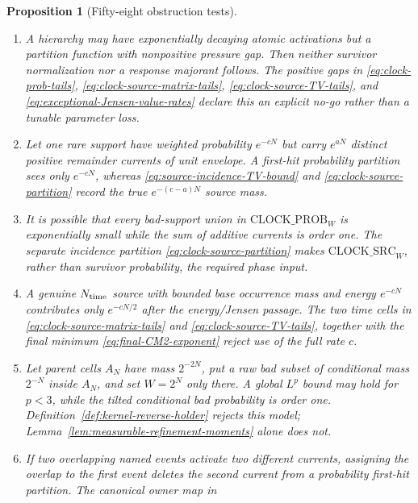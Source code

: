 \documentclass[11pt]{article}
\newtheorem{proposition}[theorem]{Proposition}
\begin{document}
\begin{proposition}[Fifty-eight obstruction tests]
\begin{enumerate}[label=\textup{(T\arabic*)}]
      \eqref{eq:upper-scale-excess-tail} prevents the upper-scale ledger from
      evaluating a nonexistent random variable; cemetery mass is charged by
      $\mathrm{CEM\_DOM}$ and $\mathrm{CLOCK\_PROB}_{W}$.
\item A hierarchy may have exponentially decaying atomic activations but a
      partition function with nonpositive pressure gap.  Then neither
      survivor normalization nor a response majorant follows.  The positive
      gaps in \eqref{eq:clock-prob-tails},
      \eqref{eq:clock-source-matrix-tails},
      \eqref{eq:clock-source-TV-tails}, and
      \eqref{eq:exceptional-Jensen-value-rates} declare this an explicit
      no-go rather than a tunable parameter loss.
\item Let one rare support have weighted probability $e^{-cN}$ but carry
      $e^{aN}$ distinct positive remainder currents of unit envelope.  A
      first-hit probability partition sees only $e^{-cN}$, whereas
      \eqref{eq:source-incidence-TV-bound} and
      \eqref{eq:clock-source-partition} record the true
      $e^{-(c-a)N}$ source mass.
\item It is possible that every bad-support union in
      $\mathrm{CLOCK\_PROB}_{W}$ is exponentially small while the sum of
      additive currents is order one.  The separate incidence partition
      \eqref{eq:clock-source-partition} makes
      $\mathrm{CLOCK\_SRC}_{W}$, rather than survivor probability, the
      required phase input.
\item A genuine $N_{\rm time}$ source with bounded base occurrence mass and
      energy $e^{-cN}$ contributes only $e^{-cN/2}$ after the
      energy/Jensen passage.  The two time
      cells in \eqref{eq:clock-source-matrix-tails} and
      \eqref{eq:clock-source-TV-tails}, together with the final minimum
      \eqref{eq:final-CM2-exponent} reject use of the full rate $c$.
\item Let parent cells $A_N$ have mass $2^{-2N}$, put a raw bad subset of
      conditional mass $2^{-N}$ inside $A_N$, and set $W=2^N$ only there.
      A global $L^p$ bound may hold for $p<3$, while the tilted conditional
      bad probability is order one.  Definition~\ref{def:kernel-reverse-holder}
      rejects this model; Lemma~\ref{lem:measurable-refinement-moments} alone
      does not.
\item If two overlapping named events activate two different currents,
      assigning the overlap to the first event deletes the second current
      from a probability first-hit partition.  The canonical owner map in

\end{enumerate}
\end{proposition}
\end{document}
